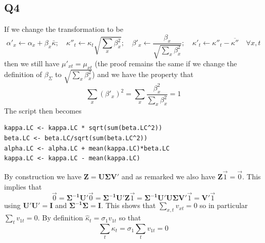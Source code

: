 \documentclass[11pt]{article}
\begin{document}
\subsection*{Q4}
If we change the transformation to be
\begin{equation}
\alpha'_x  \leftarrow \alpha_x  + \beta_x \bar{\kappa}; \quad \kappa''_t \leftarrow \kappa_t {\sqrt{\sum_x \beta_x^2}}; \quad \beta'_x \leftarrow \frac{\beta_x}{\sqrt{\sum_x \beta_x^2}}; \quad \kappa'_t \leftarrow \kappa''_t  - \overline{\kappa''} \quad \forall x,t
\end{equation}
then we still have $\mu'_{xt} = \mu_{xt}$ (the proof remains the same if we change the definition of $\beta_\Sigma$ to $\sqrt{\sum_x \beta_x^2}$) and we have the property that
\begin{equation}
\sum_x (\beta'_x)^2 = \sum_x \frac{\beta_x^2}{\sum_x \beta_x^2} = 1
\end{equation}
The script then becomes
\begin{verbatim}
kappa.LC <- kappa.LC * sqrt(sum(beta.LC^2))
beta.LC <- beta.LC/sqrt(sum(beta.LC^2))
alpha.LC <- alpha.LC + mean(kappa.LC)*beta.LC
kappa.LC <- kappa.LC - mean(kappa.LC)
\end{verbatim}
By construction we have $ \mathbf{Z} = \mathbf{U} \mathbf{\Sigma} \mathbf{V'}$ and as remarked we also have $\mathbf{Z} \vec{1} = \vec{0}$. This implies that 
\begin{equation}
\vec{0} = \mathbf{\Sigma^{-1}} \mathbf{U'} \vec{0} =\mathbf{\Sigma^{-1}} \mathbf{U'} \mathbf{Z} \vec{1} = \mathbf{\Sigma^{-1}} \mathbf{U'} \mathbf{U} \mathbf{\Sigma} \mathbf{V'} \vec{1} = \mathbf{V'} \vec{1}
\end{equation}
using $\mathbf{U'} \mathbf{U'} = \mathbf{I}$ and $\mathbf{\Sigma^{-1}} \mathbf{\Sigma} = \mathbf{I}$. This shows that $\sum_{x,t} v_{xt} = 0$ so in particular $\sum_t v_{1t} = 0$. By definition $\hat{\kappa}_t = \sigma_1 v_{1t}$ so that 
\begin{equation}
\sum_t \kappa_t = \sigma_1 \sum_t v_{1t} = 0
\end{equation}
\end{document}

